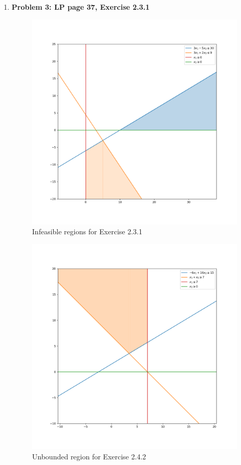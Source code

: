 \documentclass[11pt]{article}
\begin{document}
\begin{enumerate}

\item[]{\textbf{Problem 3: LP page 37, Exercise 2.3.1}}
\begin{figure}
    \centering
    \includegraphics[width=\textwidth]{MSOR411/Homework/4/p3.png}
    \caption{Infeasible regions for Exercise 2.3.1}
    \label{fig:p3}
\end{figure}
\begin{figure}
    \centering
    \includegraphics[width=\textwidth]{MSOR411/Homework/4/p4.png}
    \caption{Unbounded region for Exercise 2.4.2} 
    \label{fig:p4}
\end{figure}


\end{enumerate}
\end{document}
